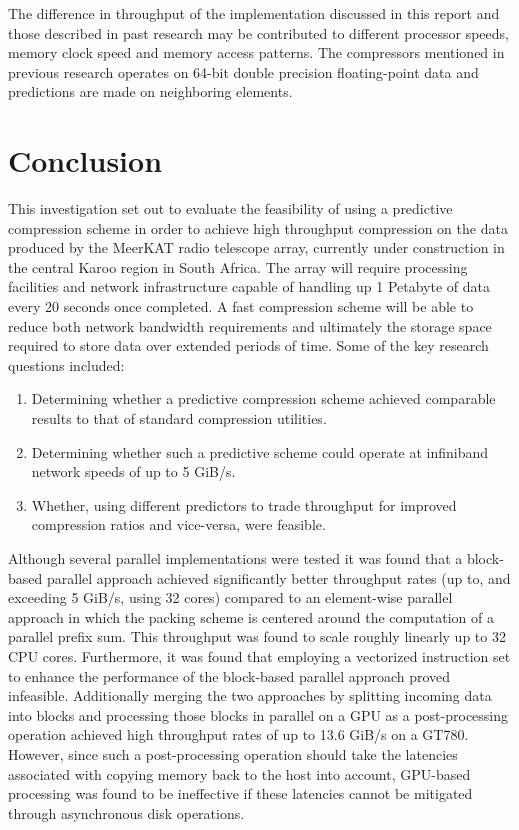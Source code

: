 The difference in throughput of the implementation discussed in this report and those described in past research may be contributed to different processor speeds, memory clock speed
and memory access patterns. The compressors mentioned in previous research operates on 64-bit double precision floating-point data and predictions are made on neighboring elements. 
\section{Conclusion}
This investigation set out to evaluate the feasibility of using a predictive compression scheme in order to achieve high throughput compression on the data produced by the MeerKAT radio telescope array, currently under construction
in the central Karoo region in South Africa. The array will require processing facilities and network infrastructure capable of handling up 1 Petabyte of data every 20 seconds once completed. A fast compression scheme will be able
to reduce both network bandwidth requirements and ultimately the storage space required to store data over extended periods of time. Some of the key research questions included:
\begin{enumerate}
 \item Determining whether a predictive compression scheme achieved comparable results to that of standard compression utilities.
 \item Determining whether such a predictive scheme could operate at infiniband network speeds of up to 5 GiB/s.
 \item Whether, using different predictors to trade throughput for improved compression ratios and vice-versa, were feasible.
\end{enumerate}
Although several parallel implementations were tested it was found that a block-based parallel approach achieved significantly better throughput rates (up to, and exceeding 5 GiB/s, using 32 cores) compared to an 
element-wise parallel approach in which the packing scheme is centered around the computation of a parallel prefix sum. This throughput was found to scale roughly linearly up to 32 CPU cores. Furthermore, it was 
found that employing a vectorized instruction set to enhance the performance of the block-based parallel approach proved infeasible. Additionally merging the two approaches by splitting incoming data into blocks 
and processing those blocks in parallel on a GPU as a post-processing operation achieved high throughput rates of up to 13.6 GiB/s on a GT780. However, since such a post-processing operation should take the 
latencies associated with copying memory back to the host into account, GPU-based processing was found to be ineffective if these latencies cannot be mitigated through asynchronous disk operations.

